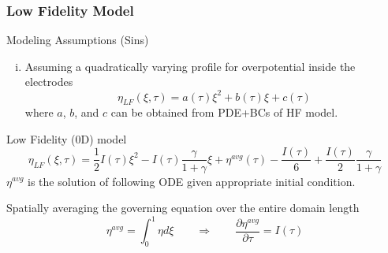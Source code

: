 \documentclass[10pt,xcolor=dvipsnames,compress]{beamer}
\begin{document}
\begin{frame}
\frametitle{Low Fidelity Model}
\vfill


\begin{alertblock}{Modeling Assumptions (Sins)}
\begin{enumerate}[i.]

\item Assuming a quadratically varying profile for overpotential inside the electrodes
\begin{equation*}\label{eq:quadratic}
\eta_{LF} (\xi,\tau)= a(\tau)\xi^2 + b(\tau)\xi + c(\tau)
\end{equation*}
where $a$, $b$, and $c$ can be obtained from PDE+BCs of HF model.

\end{enumerate}
\end{alertblock}

\begin{block}{Low Fidelity (0D) model}
\begin{equation*}\label{eq:LF}
\eta_{LF}(\xi,\tau) = 
\frac{1}{2}I(\tau)\xi^2 - I(\tau) \frac{\gamma}{1+\gamma}\xi + {\eta}^{avg}(\tau) - \frac{I(\tau)}{6} + \frac{I(\tau)}{2}\frac{\gamma}{1+\gamma}
\end{equation*}
${\eta}^{avg}$ is the solution of following ODE given appropriate initial condition.

Spatially
averaging the governing equation over the entire domain length
%
\begin{equation*}\label{eq:LF_avg}
\eta^{avg} = \int_0^1 \eta d\xi \qquad \Rightarrow \qquad
\frac{\partial{\eta}^{avg}}{\partial\tau} = I(\tau)
\end{equation*}
\end{block}


\vfill
\end{frame}
\end{document}
